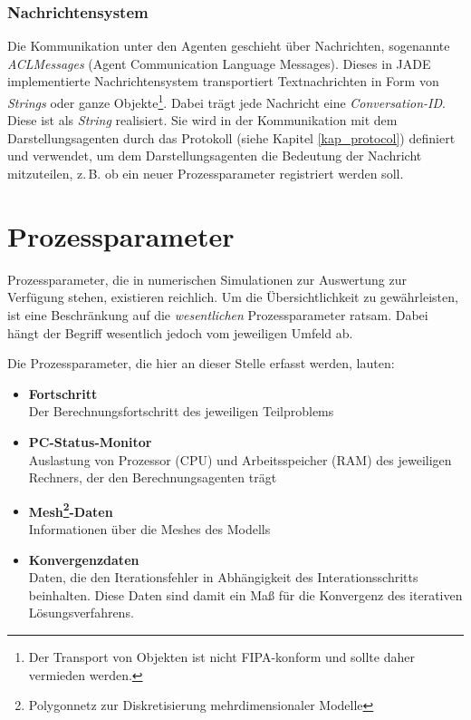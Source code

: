 \documentclass[a4paper,12pt,oneside,openright,onecolumn,final,titlepage,fleqn,ngerman]{scrreprt}
\newcommand{\zB}{z.\,B.}
\newcommand{\calcag}{Berechnungsagent}
\newcommand{\repag}{Darstellungsagent}
\begin{document}
	\subsection{Nachrichtensystem}\label{kap_messageSystem}
	Die Kommunikation unter den Agenten geschieht über Nachrichten, sogenannte \emph{ACLMessages} (Agent Communication Language Messages). Dieses in \mbox{JADE} implementierte Nachrichtensystem transportiert Textnachrichten in Form von  \emph{Strings} oder ganze Objekte\footnote{Der Transport von Objekten ist nicht FIPA-konform und sollte daher vermieden werden. }. Dabei trägt jede Nachricht eine \emph{Conversation-ID}. Diese ist als \emph{String} realisiert. Sie wird in der Kommunikation mit dem \repag{}en durch das Protokoll (siehe Kapitel \ref{kap_protocol}) definiert und verwendet, um dem \repag{}en die Bedeutung der Nachricht mitzuteilen, \zB{} ob ein neuer Prozessparameter registriert werden soll.

	\chapter{Prozessparameter}\label{kap_parameter}
	Prozessparameter, die in numerischen Simulationen zur Auswertung zur Ver\-fü\-gung stehen, existieren reichlich. Um die Übersichtlichkeit zu gewährleisten, ist eine Beschränkung auf die \emph{wesentlichen} Prozessparameter ratsam. Dabei hängt der Begriff \glq{}wesentlich\grq{} jedoch vom jeweiligen Umfeld ab.
	
	Die Prozessparameter, die hier an dieser Stelle erfasst werden, lauten:
	\begin{itemize}
		\item \textbf{Fortschritt}\\Der Berechnungsfortschritt des jeweiligen Teilproblems
		\item \textbf{PC-Status-Monitor}\\Auslastung von Prozessor (CPU) und Arbeitsspeicher (RAM) des jeweiligen Rechners, der den \calcag{}en trägt
		\item \textbf{Mesh\footnote{Polygonnetz zur Diskretisierung mehrdimensionaler Modelle}-Daten}\\Informationen über die Meshes des Modells
		\item \textbf{Konvergenzdaten}\\Daten, die den Iterationsfehler in Abhängigkeit des Interationsschritts be\-in\-hal\-ten. Diese Daten sind damit ein Maß für die Konvergenz des iterativen Lösungsverfahrens.
	\end{itemize}
	
\end{document}
